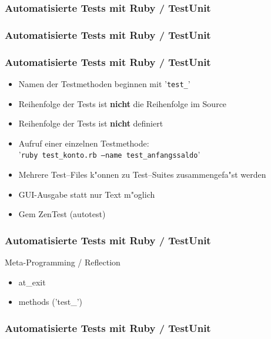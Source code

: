 \documentclass{beamer}
\begin{document}
\begin{frame}[containsverbatim]
  \frametitle{Automatisierte Tests mit Ruby / TestUnit}

\end{frame}

\begin{frame}[containsverbatim]
  \frametitle{Automatisierte Tests mit Ruby / TestUnit}

\end{frame}

\begin{frame}
  \frametitle{Automatisierte Tests mit Ruby / TestUnit}
  \begin{itemize}
    \item Namen der Testmethoden beginnen mit '\texttt{test\_}'
    \item Reihenfolge der Tests ist {\bf nicht} die Reihenfolge im Source
    \item Reihenfolge der Tests ist {\bf nicht} definiert
    \item Aufruf einer einzelnen Testmethode:\\ '\texttt{ruby test\_konto.rb --name test\_anfangssaldo}'
    \item Mehrere Test--Files k"onnen zu Test--Suites zusammengefa"st werden
    \item GUI-Ausgabe statt nur Text m"oglich
    \item Gem ZenTest (autotest)
  \end{itemize}
\end{frame}

\begin{frame}
  \frametitle{Automatisierte Tests mit Ruby / TestUnit}
  Meta-Programming / Reflection
  \begin{itemize}
    \item at\_exit
    \item methods ('test\_')
  \end{itemize}
\end{frame}

\begin{frame}[containsverbatim]
  \frametitle{Automatisierte Tests mit Ruby / TestUnit}
  
\end{frame}
\end{document}
